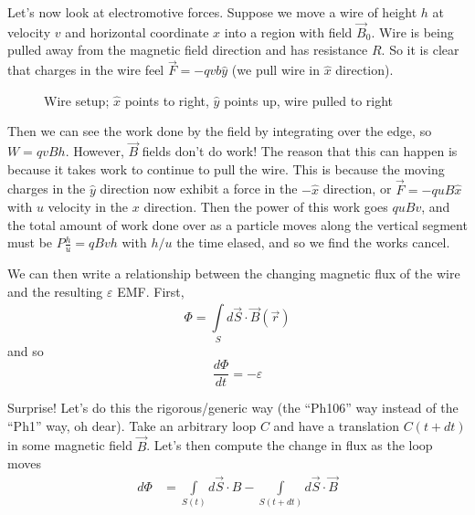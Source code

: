 \documentclass[10pt]{report}
\newcommand{\rd}[2]{\frac{d#1}{d#2}}
\begin{document}
Let's now look at electromotive forces. Suppose we move a wire of height $h$ at velocity $v$ and horizontal coordinate $x$ into a region with field $\vec{B}_0$. Wire is being pulled away from the magnetic field direction and has resistance $R$. So it is clear that charges in the wire feel $\vec{F} = -qvb\hat{y}$ (we pull wire in $\hat{x}$ direction). 
\begin{figure}[!h]
    \centering
    \caption{Wire setup; $\hat{x}$ points to right, $\hat{y}$ points up, wire pulled to right}
    \label{4.17.setup}
\end{figure}

Then we can see the work done by the field by integrating over the edge, so $W = qvBh$. However, $\vec{B}$ fields don't do work! The reason that this can happen is because it takes work to continue to pull the wire. This is because the moving charges in the $\hat{y}$ direction now exhibit a force in the $-\hat{x}$ direction, or $\vec{F} = -quB\hat{x}$ with $u$ velocity in the $x$ direction. Then the power of this work goes $quBv$, and the total amount of work done over as a particle moves along the vertical segment must be $P \frac{h}{u} = qBvh$ with $h/u$ the time elased, and so we find the works cancel. 

We can then write a relationship between the changing magnetic flux of the wire and the resulting $\varepsilon$ EMF. First,
\begin{equation}
    \Phi = \int\limits_{S}^{}d\vec{S} \cdot \vec{B}(\vec{r})
\end{equation}
and so
\begin{equation}
    \rd{\Phi}{t} = -\varepsilon
\end{equation}

Surprise! Let's do this the rigorous/generic way (the ``Ph106'' way instead of the ``Ph1'' way, oh dear). Take an arbitrary loop $C$ and have a translation $C(t + dt)$ in some magnetic field $\vec{B}$. Let's then compute the change in flux as the loop moves
\begin{align}
    d\Phi &= \int\limits_{S(t)}^{}d\vec{S}\cdot B - \int\limits_{S(t + dt)}^{}d\vec{S} \cdot \vec{B}
\end{align}
\end{document}
